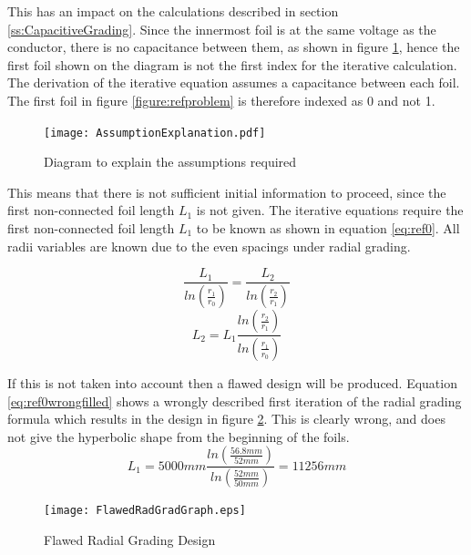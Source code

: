 This has an impact on the calculations described in section \ref{ss:CapacitiveGrading}.
Since the innermost foil is at the same voltage as the conductor, there is no capacitance between them, as shown in figure \ref{figure:required assumptions}, hence the first foil shown on the diagram is not the first index for the iterative calculation.
The derivation of the iterative equation assumes a capacitance between each foil. 
The first foil in figure \ref{figure:refproblem} is therefore indexed as 0 and not 1.

\begin{figure}[!h]
   \centering
   \texttt{[image: AssumptionExplanation.pdf]}
   \caption{Diagram to explain the assumptions required}
   \label{figure:required assumptions}
\end{figure}

This means that there is not sufficient initial information to proceed, since the first non-connected foil length $L_1$ is not given.
The iterative equations require the first non-connected foil length $L_1$ to be known as shown in equation \ref{eq:ref0}. 
All radii variables are known due to the even spacings under radial grading. 

\begin{equation}
   \label{eq:ref0}
   \displaystyle\frac{L_{1}}{ln(\displaystyle\frac{r_{1}}{r_{0}})} = \displaystyle\frac{ L_{2}}{ln(\displaystyle\frac{r_{2}}{r_{1}})} 
\end{equation}
\begin{equation}
   \label{eq:ref0forl1}
   L_{2} = L_{1}\displaystyle\frac{{ln(\displaystyle\frac{r_{2}}{r_{1}})} }{ln(\displaystyle\frac{r_{1}}{r_{0}})}
\end{equation}



If this is not taken into account then a flawed design will be produced.
Equation \ref{eq:ref0wrongfilled} shows a wrongly described first iteration of the radial grading formula which results in the design in figure \ref{figure:flawedgraph}. This is clearly wrong, and does not give the hyperbolic shape from the beginning of the foils.
\begin{equation}
   \label{eq:ref0wrongfilled}
   L_{1} = 5000mm\displaystyle\frac{{ln(\displaystyle\frac{56.8mm}{52mm})} }{ln(\displaystyle\frac{52mm}{50mm})}
   = 11256mm
\end{equation}

\begin{figure}[!h]
   \centering
   \texttt{[image: FlawedRadGradGraph.eps]}
   \caption{Flawed Radial Grading Design}
   \label{figure:flawedgraph}
\end{figure}

